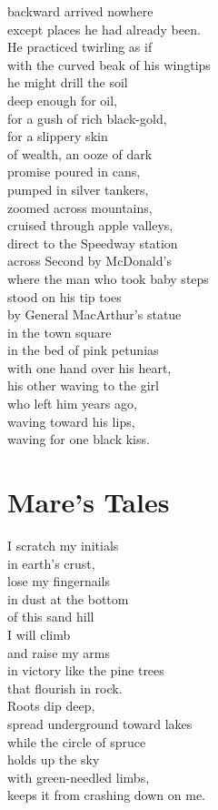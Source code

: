 \documentclass[twoside,10pt]{book}
\begin{document}
backward arrived nowhere\\
except places he had already been.\\
He practiced twirling as if\\
with the curved beak of his wingtips\\
he might drill the soil\\
deep enough for oil,\\
for a gush of rich black-gold,\\
for a slippery skin\\
of wealth, an ooze of dark\\
promise poured in cans,\\
pumped in silver tankers,\\
zoomed across mountains,\\
cruised through apple valleys,\\
direct to the Speedway station\\
across Second by McDonald's\\
where the man who took baby steps\\
stood on his tip toes\\
by General MacArthur's statue\\
in the town square\\
in the bed of pink petunias\\
with one hand over his heart,\\
his other waving to the girl\\
who left him years ago,\\
waving toward his lips,\\
waving for one black kiss.


\clearpage
\section{Mare's Tales}

I scratch my initials\\
in earth's crust,\\
lose my fingernails\\
in dust at the bottom\\
of this sand hill\\
I will climb\\
and raise my arms\\
in victory like the pine trees\\
that flourish in rock.\\
Roots dip deep,\\
spread underground toward lakes\\
while the circle of spruce\\
holds up the sky\\
with green-needled limbs,\\
keeps it from crashing down on me.
\end{document}
